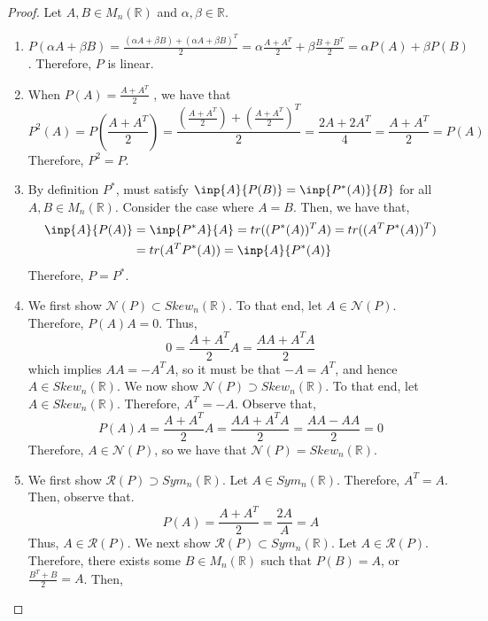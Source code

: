 \documentclass[letterpaper,12pt]{article}
\theoremstyle{definition}
\begin{document}
\begin{proof}
	Let $A, B \in M_n(\mathbb{R})$ and $\alpha, \beta \in \mathbb{R}$.
	\begin{enumerate}
		\item $P(\alpha A + \beta B) = \frac{(\alpha A + \beta B) + (\alpha A + \beta B)^T}{2} = \alpha \frac{A + A^T}{2} + \beta\frac{B + B^T}{2} = \alpha P(A) +\beta P(B)$. Therefore, $P$ is linear.
		\item When $P(A) = \frac{A + A^T}{2}$ , we have that 
		\begin{equation}
		P^2(A) = P\left( \frac{A + A^T}{2} \right) = \frac{\left(\frac{A + A^T}{2}\right) + \left(\frac{A + A^T}{2}\right)^T}{2} = \frac{2A + 2A^T}{4} = \frac{A + A^T}{2} = P(A)
		\end{equation}
		Therefore, $P^2 = P$.
		\item By definition $P^*$, must satisfy $\inp{A}{P(B)} = \inp{P^*(A)}{B}$ for all $A, B \in M_n(\mathbb{R})$. Consider the case where $A = B$. Then, we have that,
		\begin{align*}
			\inp{A}{P(A)} &= \inp{P^*A}{A} = tr((P^*(A))^TA) = tr((A^T P^*(A))^T) \\
			&= tr(A^T P^*(A)) = \inp{A}{P^*(A)}
		\end{align*}
		Therefore, $P = P^*$.
		\item We first show $\mathscr{N}(P) \subset Skew_n(\mathbb{R})$. To that end, let $A \in \mathscr{N}(P)$. Therefore, $P(A)A = 0$. Thus,
		\begin{equation}
		0 = \frac{A + A^T}{2} A = \frac{AA + A^TA}{2} 
		\end{equation}
		which implies $AA = -A^TA$, so it must be that $-A = A^T$, and hence $A \in Skew_n(\mathbb{R})$. We now show $\mathscr{N}(P) \supset Skew_n(\mathbb{R})$. To that end, let $A \in  Skew_n(\mathbb{R})$. Therefore, $A^T = -A$. Observe that,
		\begin{equation}
		P(A) A =  \frac{A + A^T}{2} A =  \frac{AA + A^TA}{2}  = \frac{AA - AA}{2} = 0
		\end{equation}
		Therefore, $A \in \mathscr{N}(P)$, so we have that $\mathscr{N}(P) = Skew_n(\mathbb{R})$.
		\item We first show $\mathscr{R}(P) \supset Sym_n(\mathbb{R})$. Let $A \in Sym_n(\mathbb{R})$. Therefore, $A^T = A$. Then, observe that.
		\begin{equation}
			P(A) = \frac{A+A^T}{2} = \frac{2A}{A} = A
		\end{equation}
		Thus, $A \in \mathscr{R}(P)$. We next show $\mathscr{R}(P) \subset Sym_n(\mathbb{R})$. Let $A \in \mathscr{R}(P)$. Therefore, there exists some $B \in M_n(\mathbb{R})$ such that $P(B) = A$, or $\frac{B^T + B}{2} = A$. Then,

\end{enumerate}
\end{proof}
\end{document}
